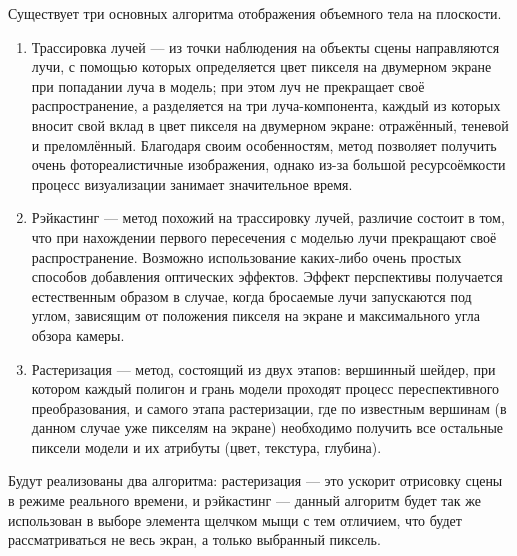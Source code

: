 Существует три основных алгоритма отображения объемного тела на плоскости.
\begin{enumerate}
	\item Трассировка лучей --- из точки наблюдения на объекты сцены направляются лучи, с помощью которых определяется цвет пикселя на двумерном экране при попадании луча в модель; при этом луч не прекращает своё распространение, а разделяется на три луча-компонента, каждый из которых вносит свой вклад в цвет пикселя на двумерном экране: отражённый, теневой и преломлённый. Благодаря своим особенностям, метод позволяет получить очень фотореалистичные изображения, однако из-за большой ресурсоёмкости процесс визуализации занимает значительное время.
	\item Рэйкастинг --- метод похожий на трассировку лучей, различие состоит в том, что при нахождении первого пересечения с моделью лучи прекращают своё распространение. Возможно использование каких-либо очень простых способов добавления оптических эффектов. Эффект перспективы получается естественным образом в случае, когда бросаемые лучи запускаются под углом, зависящим от положения пикселя на экране и максимального угла обзора камеры.
	\item Растеризация --- метод, состоящий из двух этапов: вершинный шейдер, при котором каждый полигон и грань модели проходят процесс переспективного преобразования, и самого этапа растеризации, где по известным вершинам (в данном случае уже пикселям на экране) необходимо получить все остальные пиксели модели и их атрибуты (цвет, текстура, глубина). 
\end{enumerate}
Будут реализованы два алгоритма: растеризация --- это ускорит отрисовку сцены в режиме реального времени, и рэйкастинг --- данный алгоритм будет так же использован в выборе элемента щелчком мыщи с тем отличием, что будет рассматриваться не весь экран, а только выбранный пиксель.
